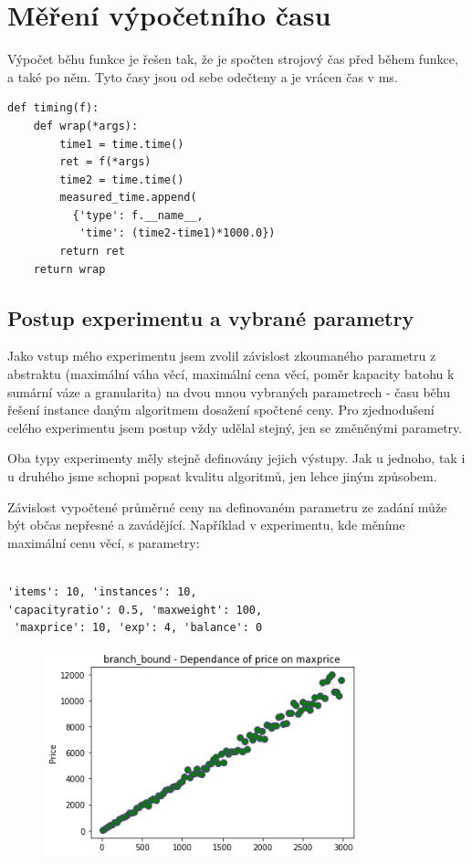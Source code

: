 \documentclass[a4paper,10pt,twocolumn]{article}
\begin{document}
\section{Měření výpočetního času}
Výpočet běhu funkce je řešen tak, že je spočten strojový čas před během funkce, a také po něm. Tyto časy jsou od sebe odečteny a je vrácen čas v ms.

   \begin{verbatim}
def timing(f):
    def wrap(*args):
        time1 = time.time()
        ret = f(*args)
        time2 = time.time()
        measured_time.append(
          {'type': f.__name__,
           'time': (time2-time1)*1000.0})
        return ret
    return wrap
   \end{verbatim}


\subsection{Postup experimentu a vybrané parametry}

Jako vstup mého experimentu jsem zvolil závislost zkoumaného parametru z abstraktu (maximální váha věcí, maximální cena věcí,
poměr kapacity batohu k sumární váze a granularita) na dvou mnou vybraných parametrech - času běhu řešení instance daným algoritmem dosažení spočtené ceny. Pro zjednodušení celého experimentu jsem postup vždy udělal stejný, jen se změněnými parametry.

Oba typy experimenty měly stejně definovány jejich výstupy. Jak u jednoho, tak i u druhého jsme schopni popsat kvalitu algoritmů, jen lehce jiným způsobem. 

Závislost vypočtené průměrné ceny na definovaném parametru ze zadání může být občas nepřesné a zavádějící. Například v experimentu, kde měníme maximální cenu věcí, s parametry:
   \begin{verbatim}

'items': 10, 'instances': 10, 
'capacityratio': 0.5, 'maxweight': 100,
 'maxprice': 10, 'exp': 4, 'balance': 0
    \end{verbatim}

\begin{figure}[H]
  \begin{center}
    \includegraphics[height=6cm]{graphs/price_on_maxprice_branch_bound.png}
  \end{center}
\end{figure}
\end{document}
